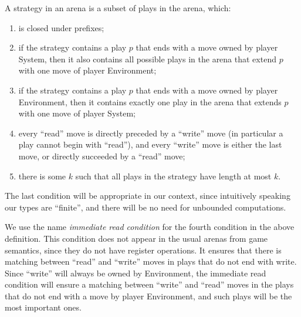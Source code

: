 \begin{definition}[Strategy]
    A strategy  in an arena  is a subset of plays in the arena, which: 
    \begin{enumerate}
        \item is closed under prefixes;
        \item if the strategy contains a play $p$ that ends with a move owned by player System, then it also contains all possible plays  in the arena that extend $p$ with one move of player Environment;
        \item if the strategy contains a play $p$ that ends with a move owned by player Environment, then it contains exactly one play  in the arena that extends $p$ with one move of player System;
        \item every ``read'' move is directly preceded by a ``write'' move (in particular a play cannot begin with ``read''), and every ``write'' move is either the last move, or directly succeeded by a ``read'' move;
        \item there is some $k$ such that all plays in the strategy have length at most $k$.
    \end{enumerate}
\end{definition}

The last condition will be appropriate in our context, since intuitively speaking our types are ``finite'', and there will be no need for unbounded computations.

We use the name \emph{immediate read condition} for the fourth condition in the above definition. This condition does not appear in the usual arenas from game semantics, since they do not have register operations. It ensures that there is matching between ``read'' and ``write'' moves in plays that do not end with write. Since ``write'' will always be owned by Environment, the immediate read condition will ensure a matching between ``write'' and ``read'' moves in the plays that do not end with a move by player Environment, and such plays will be the most important ones. 

